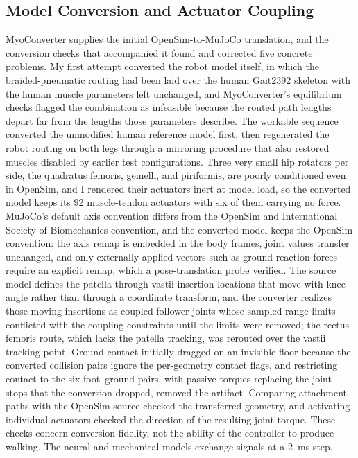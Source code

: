 \subsection{Model Conversion and Actuator Coupling}\label{sec:sns_existing_tools}

MyoConverter supplies the initial OpenSim-to-MuJoCo translation, and the conversion checks that accompanied it found and corrected five concrete problems. My first attempt converted the robot model itself, in which the braided-pneumatic routing had been laid over the human Gait2392 skeleton with the human muscle parameters left unchanged, and MyoConverter's equilibrium checks flagged the combination as infeasible because the routed path lengths depart far from the lengths those parameters describe. The workable sequence converted the unmodified human reference model first, then regenerated the robot routing on both legs through a mirroring procedure that also restored muscles disabled by earlier test configurations. Three very small hip rotators per side, the quadratus femoris, gemelli, and piriformis, are poorly conditioned even in OpenSim, and I rendered their actuators inert at model load, so the converted model keeps its 92 muscle-tendon actuators with six of them carrying no force. MuJoCo's default axis convention differs from the OpenSim and International Society of Biomechanics convention, and the converted model keeps the OpenSim convention: the axis remap is embedded in the body frames, joint values transfer unchanged, and only externally applied vectors such as ground-reaction forces require an explicit remap, which a pose-translation probe verified. The source model defines the patella through vastii insertion locations that move with knee angle rather than through a coordinate transform, and the converter realizes those moving insertions as coupled follower joints whose sampled range limits conflicted with the coupling constraints until the limits were removed; the rectus femoris route, which lacks the patella tracking, was rerouted over the vastii tracking point. Ground contact initially dragged on an invisible floor because the converted collision pairs ignore the per-geometry contact flags, and restricting contact to the six foot--ground pairs, with passive torques replacing the joint stops that the conversion dropped, removed the artifact. Comparing attachment paths with the OpenSim source checked the transferred geometry, and activating individual actuators checked the direction of the resulting joint torque. These checks concern conversion fidelity, not the ability of the controller to produce walking. The neural and mechanical models exchange signals at a \qty{2}{\milli\second} step.

